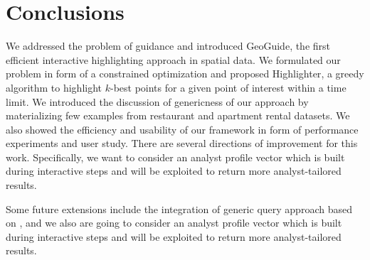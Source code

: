 \documentclass[conference,compsoc]{IEEEtran}
\newcommand{\framework}{{\sc GeoGuide}}
\begin{document}
\section{Conclusions}
\label{sec:conclusions}

We addressed the problem of guidance and introduced \framework, the first efficient interactive highlighting approach in spatial data. We formulated our problem in form of a constrained optimization and proposed {\sc Highlighter}, a greedy algorithm to highlight $k$-best points for a given point of interest within a time limit. We introduced the discussion of genericness of our approach by materializing few examples from restaurant and apartment rental datasets. We also showed the efficiency and usability of our framework in form of performance experiments and user study. There are several directions of improvement for this work. Specifically, we want to consider an analyst profile vector which is built during interactive steps and will be exploited to return more analyst-tailored results.

Some future extensions include the integration of generic query approach based on \cite{VartakRMPP15}, and we also are going to consider an analyst profile vector which is built during interactive steps and will be exploited to return more analyst-tailored results.






\end{document}
